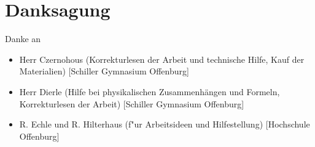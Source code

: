 \chapter{Danksagung}
Danke an \\
\begin{itemize}
    \item Herr Czernohous (Korrekturlesen der Arbeit und technische Hilfe, Kauf der Materialien) [Schiller Gymnasium Offenburg]
    \item Herr Dierle (Hilfe bei physikalischen Zusammenhängen und Formeln, Korrekturlesen der Arbeit) [Schiller Gymnasium Offenburg]
    \item R. Echle und R. Hilterhaus (f"ur Arbeitsideen und Hilfestellung) [Hochschule Offenburg]
\end{itemize}